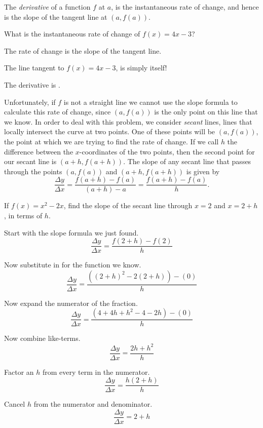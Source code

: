 \PassOptionsToClass{tikzexport}{ximera}\nonstopmode\documentclass{ximera}
\begin{document}
The \textit{derivative} of a function $f$ at $a$, is the instantaneous
rate of change, and hence is the slope of the tangent line at $(a,f(a))$. 

\begin{question}
	What is the instantaneous rate of change of $f(x) = 4x-3$?
	\begin{hint}
		The rate of change is the slope of the tangent line.
	\end{hint}
	\begin{hint}
		The line tangent to $f(x) = 4x-3$, is simply itself!
	\end{hint}
	\begin{prompt}
		The derivative is .
	\end{prompt}
\end{question}


Unfortunately, if $f$ is not a straight line we cannot use the slope formula to calculate this rate of change, since
$(a,f(a))$ is the only point on this line that we know.  In order to deal with this
problem, we consider \textit{secant} lines, lines that locally intersect the curve at two points.
One of these points will be $(a, f(a))$, the point at which we are trying to find the rate of change.
If we call $h$ the difference between the $x$-coordinates of the two points, then the second point
for our secant line is $(a+h, f(a+h))$.
The slope of any secant line that passes through the points $(a,f(a))$ and $(a+h,
f(a+h))$ is given by
\[
\frac{\Delta y}{\Delta x}=\frac{f(a+h) - f(a)}{(a+h) - a} =
\frac{f(a+h)-f(a)}{h}.
\]

\begin{example}
	If $f(x) = x^2-2x$, find the slope of the secant line through $x=2$ and $x=2+h$, in terms of $h$.
	\begin{explanation}
		Start with the slope formula we just found.
		\[ \frac{\Delta y}{\Delta x} = \frac{f(2+h)-f(2)}{h} \]

		Now substitute in for the function we know.
		\[ \frac{\Delta y}{\Delta x} = \frac{( (2+h)^2-2(2+h) )-(0)}{h} \]

		Now expand the numerator of the fraction.
		\[ \frac{\Delta y}{\Delta x} = \frac{( 4+4h+h^2-4-2h )-(0)}{h} \]
		
		Now combine like-terms.
		\[ \frac{\Delta y}{\Delta x} = \frac{2h+h^2}{h} \]

		Factor an $h$ from every term in the numerator.
		\[ \frac{\Delta y}{\Delta x} = \frac{h(2+h)}{h} \]

		Cancel $h$ from the numerator and denominator.
		\[ \frac{\Delta y}{\Delta x} = 2+h \]
	\end{explanation}
\end{example}
\end{document}
